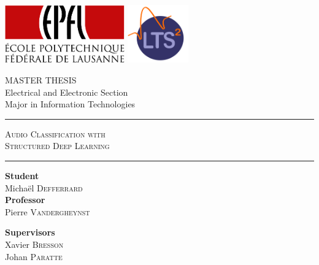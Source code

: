 \documentclass[a4paper,12pt,twoside]{report}
\newcommand{\HRule}{\rule{\linewidth}{0.5mm}}
\begin{document}
\hypersetup{pageanchor=false}
\begin{titlepage}
	
	\includegraphics[height=2.5cm]{img/logo_epfl}
	\hfill
	\includegraphics[height=2.5cm]{img/logo_lts2}
	\vspace{1.5cm}
	
	\begin{center}
		
		\textsc{\LARGE MASTER THESIS}\\
		\vspace{0.5cm}
		\large Electrical and Electronic Section\\
		\large Major in Information Technologies\\
		\vspace{1.3cm}
		
		\HRule
		\vspace{1.0cm}
		\textsc{\Huge Audio Classification with}\\
		\vspace{0.7cm}
		\textsc{\Huge Structured Deep Learning}\\
		\vspace{0.6cm}
		\HRule
		\vspace{1.3cm}
		
		\begin{minipage}{0.45\textwidth}
			\begin{flushleft} \large
				\textbf{Student}\\ \vspace{0.5ex}
				Michaël \textsc{Defferrard} \\ \vspace{2.5ex}
				\textbf{Professor} \\ \vspace{0.5ex}
				Pierre \textsc{Vandergheynst}
			\end{flushleft}
		\end{minipage}
		\begin{minipage}{0.45\textwidth}
			\begin{flushright} \large
				\textbf{Supervisors} \\ \vspace{0.5ex}
				Xavier \textsc{Bresson} \\ \vspace{0.2ex}
				Johan \textsc{Paratte}
			\end{flushright}
		\end{minipage}
		

\end{center}
\end{titlepage}
\end{document}
